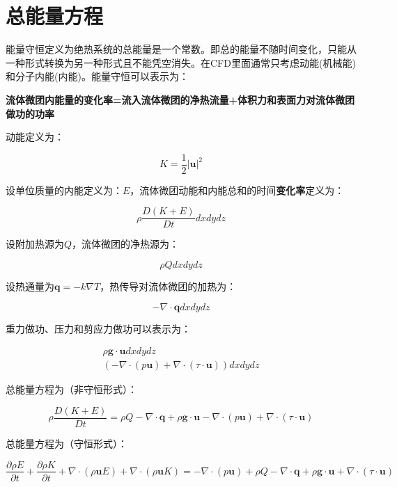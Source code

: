\section{总能量方程}
能量守恒定义为绝热系统的总能量是一个常数。即总的能量不随时间变化，只能从一种形式转换为另一种形式且不能凭空消失。在CFD里面通常只考虑动能(机械能)和分子内能(内能)。能量守恒可以表示为：

\begin{center}
\textbf{流体微团内能量的变化率=流入流体微团的净热流量+体积力和表面力对流体微团做功的功率}
\end{center}

动能定义为：

\begin{equation}
K=\frac{1}{2}|\bm{u}|^2
\end{equation}

设单位质量的内能定义为：$ E $，流体微团动能和内能总和的时间\textbf{变化率}定义为：

\begin{equation}
\rho\frac{D(K+E)}{Dt}dxdydz
\end{equation}

设附加热源为$ Q $，流体微团的净热源为：

\begin{equation}
\rho Qdxdydz
\end{equation}

设热通量为$ \bm{q}=-k\nabla T $，热传导对流体微团的加热为：

\begin{equation}
-\nabla \cdot\bm{q}dxdydz
\end{equation}

重力做功、压力和剪应力做功可以表示为：

\begin{gather}
\rho\bm{g}\cdot\bm{u}dxdydz \\
(-\nabla\cdot(p\bm{u}) + \nabla\cdot(\tau\cdot\bm{u})) dxdydz
\end{gather}

总能量方程为（非守恒形式）：

\begin{equation}
\rho\frac{D(K+E)}{Dt} = \rho Q - \nabla\cdot\bm{q} + \rho\bm{g}\cdot\bm{u} - \nabla\cdot(p\bm{u}) + \nabla\cdot(\tau\cdot\bm{u})
\end{equation}

总能量方程为（守恒形式）：

\begin{equation}
\frac{\partial\rho E}{\partial t} + \frac{\partial\rho K}{\partial t} + \nabla\cdot(\rho\bm{u}E) + \nabla\cdot(\rho\bm{u}K) = -\nabla\cdot(p\bm{u}) + \rho Q - \nabla\cdot\bm{q} + \rho\bm{g}\cdot\bm{u} + \nabla\cdot(\tau\cdot\bm{u})
\end{equation}

